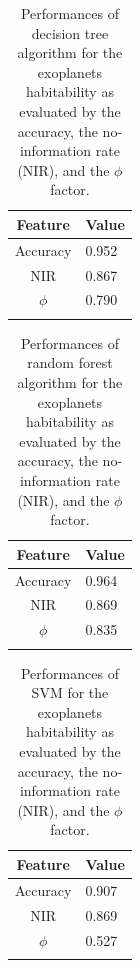 \documentclass[
12pt, %
a4paper, %
oneside, %
headinclude,footinclude, %
BCOR5mm, %
]{scrartcl}
\begin{document}
\begin{table}[]
\caption{Performances of decision tree algorithm for the exoplanets habitability as evaluated by the accuracy, the no-information rate (NIR), and the $\phi$ factor.}
\begin{center}
\begin{tabular}{l|l}
\multicolumn{1}{c|}{Feature} & Value \\ \hline
\multicolumn{1}{c|}{Accuracy} & 0.952\\ \hline
\multicolumn{1}{c|}{NIR} & 0.867 \\ \hline
\multicolumn{1}{c|}{$\phi$} & 0.790\\ 
\label{DecisionTree_perf_tab}
\end{tabular}
\end{center}
\end{table}

\begin{table}[]
\caption{Performances of random forest algorithm for the exoplanets habitability as evaluated by the accuracy, the no-information rate (NIR), and the $\phi$ factor.}
\begin{center}
\begin{tabular}{l|l}
\multicolumn{1}{c|}{Feature} & Value \\ \hline
\multicolumn{1}{c|}{Accuracy} & 0.964 \\ \hline
\multicolumn{1}{c|}{NIR} & 0.869 \\ \hline
\multicolumn{1}{c|}{$\phi$} & 0.835 \\ 
\label{Random Forest_perf_tab}
\end{tabular}
\end{center}
\end{table}

\begin{table}[]
\caption{Performances of SVM for the exoplanets habitability as evaluated by the accuracy, the no-information rate (NIR), and the $\phi$ factor.}
\begin{center}
\begin{tabular}{l|l}
\multicolumn{1}{c|}{Feature} & Value \\ \hline
\multicolumn{1}{c|}{Accuracy} & 0.907 \\ \hline
\multicolumn{1}{c|}{NIR} & 0.869 \\ \hline
\multicolumn{1}{c|}{$\phi$} & 0.527 \\ 
\label{SVM_perf_tab}
\end{tabular}
\end{center}
\end{table}
\end{document}
